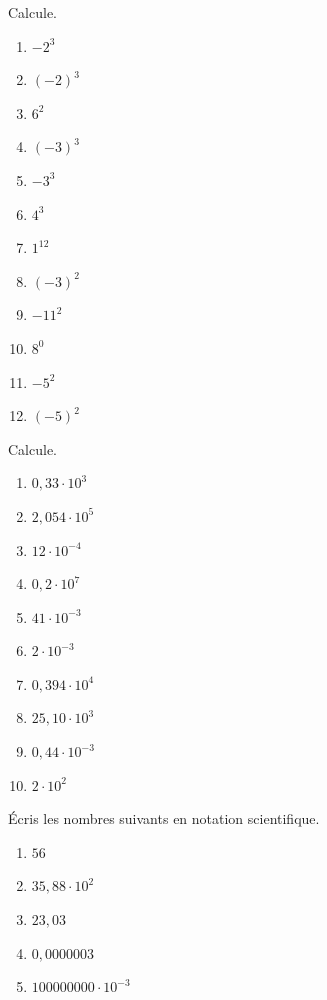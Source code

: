 \setcounter{exercise}{0}

\begin{exercise}
  Calcule.
  \begin{enumerate}[cols=3]
    \item \({- 2}^{3}\)
\item \(( - 2)^{3}\)
    \item \(6^{2}\)
    \item \(( - 3)^{3}\)
    \item \(- 3^{3}\)
    \item \(4^{3}\)
    \item \(1^{12}\)
    \item \(( - 3)^{2}\)
    \item \( - {11}^{2}\)
    \item \(8^{0}\)
    \item \({- 5}^{2}\)
    \item \(( - 5)^{2}\)
  \end{enumerate}
\end{exercise}

\begin{exercise}
  Calcule.
  \begin{enumerate}[cols=3]
    \item \(0,33 \cdot 10^{3}\)
\item \(2,054 \cdot 10^{5}\)
    \item \(12 \cdot 10^{- 4}\)
    \item \(0,2 \cdot 10^{7}\)
    \item \(41 \cdot 10^{- 3}\)
    \item \(2 \cdot 10^{- 3}\)
    \item \(0,394 \cdot 10^{4}\)
    \item \(25,10 \cdot 10^{3}\)
    \item \(0,44 \cdot 10^{- 3}\)
    \item \(2 \cdot 10^{2}\)
  \end{enumerate}
\end{exercise}

\begin{exercise}
  Écris les nombres suivants en notation scientifique. 
  \begin{enumerate}[cols=3]
    \item \(56 \)
\item \(35,88 \cdot 10^{2} \)
    \item \(23,03 \)
    \item \(0,0000003 \)
    \item \(100000000 \cdot 10^{- 3}\)
  \end{enumerate}
\end{exercise}


